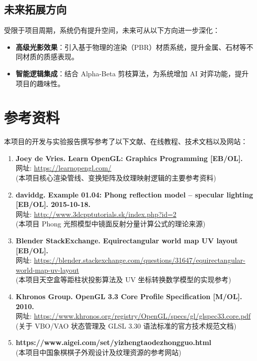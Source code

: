 \documentclass[a4paper]{article}
\begin{document}
\subsection{未来拓展方向}
受限于项目周期，系统仍有提升空间，未来可从以下方向进一步深化：
\begin{itemize}
    \item \textbf{高级光影效果}：引入基于物理的渲染（PBR）材质系统，提升金属、石材等不同材质的质感表现。
    \item \textbf{智能逻辑集成}：结合 Alpha-Beta 剪枝算法，为系统增加 AI 对弈功能，提升项目的趣味性。
\end{itemize}
\section{参考资料}

本项目的开发与实验报告撰写参考了以下文献、在线教程、技术文档以及网站：

\begin{enumerate}
    \item \textbf{Joey de Vries. Learn OpenGL: Graphics Programming [EB/OL].} \\
    网址: \url{https://learnopengl.com/} \\
    (本项目核心渲染管线、变换矩阵及纹理映射逻辑的主要参考资料)

    \item \textbf{daviddg. Example 01.04: Phong reflection model – specular lighting [EB/OL]. 2015-10-18.} \\
    网址: \url{http://www.3dcpptutorials.sk/index.php?id=2} \\
    (本项目 Phong 光照模型中镜面反射分量计算公式的理论来源)

    \item \textbf{Blender StackExchange. Equirectangular world map UV layout [EB/OL].} \\
    网址: \url{https://blender.stackexchange.com/questions/31647/equirectangular-world-map-uv-layout} \\
    (本项目天空盒等距柱状投影算法及 UV 坐标转换数学模型的实现参考)

    \item \textbf{Khronos Group. OpenGL 3.3 Core Profile Specification [M/OL]. 2010.} \\
    网址: \url{https://www.khronos.org/registry/OpenGL/specs/gl/glspec33.core.pdf} \\
    (关于 VBO/VAO 状态管理及 GLSL 3.30 语法标准的官方技术规范文档)

    \item \textbf{https://www.aigei.com/set/yizhengtaodezhongguo.html} \\
    (本项目中国象棋棋子外观设计及纹理资源的参考网站)
\end{enumerate}
\end{document}

